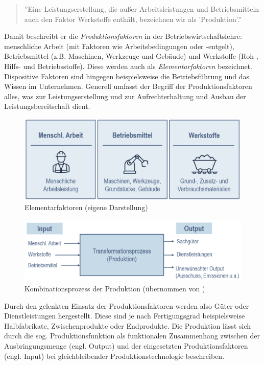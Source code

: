\documentclass[a4paper,12pt, german]{report}
\begin{document}
\begin{quote}
 ''Eine Leistungserstellung, die außer Arbeitsleistungen und Betriebsmitteln auch den Faktor Werkstoffe enthält, bezeichnen wir als 'Produktion'.''\cite{20}
\end{quote}
Damit beschreibt er die \textit{Produktionsfaktoren} in der Betriebswirtschaftslehre: menschliche Arbeit (mit Faktoren wie Arbeitsbedingungen oder -entgelt), Betriebsmittel (z.B. Maschinen, Werkzeuge und Gebäude) und Werkstoffe (Roh-, Hilfs- und Betriebsstoffe). Diese werden auch als \textit{Elementarfaktoren} bezeichnet. Dispositive Faktoren sind hingegen beispielsweise die Betriebsführung und das Wissen im Unternehmen. Generell umfasst der Begriff der Produktionsfaktoren alles, was zur Leistungserstellung und zur Aufrechterhaltung und Ausbau der Leistungsbereitschaft dient.\cite{06}

\begin{figure}%
  \center
  \includegraphics[width=12cm]{images/Elementarfaktoren.pptx.png}
  \caption[Elementarfaktoren]{Elementarfaktoren (eigene Darstellung)}
\end{figure}

\begin{figure}%
  \center
  \includegraphics[width=12cm]{images/Kombinationsprozess.png}
  \caption[Kombinationsprozess der Produktion]{Kombinationsprozess der Produktion (übernommen von \cite{07}) }
\end{figure}
Durch den gelenkten Einsatz der Produktionsfaktoren werden also Güter oder Dienstleistungen hergestellt. Diese sind je nach Fertigungsgrad beispielsweise Halbfabrikate, Zwischenprodukte oder Endprodukte.\cite{12}\newline
Die Produktion lässt sich durch die sog. Produktionsfunktion als funktionalen Zusammenhang zwischen der Ausbringungsmenge (engl. Output) und der eingesetzten Produktionsfaktoren (engl. Input) bei gleichbleibender Produktionstechnologie beschreiben.\cite{20}
\end{document}
